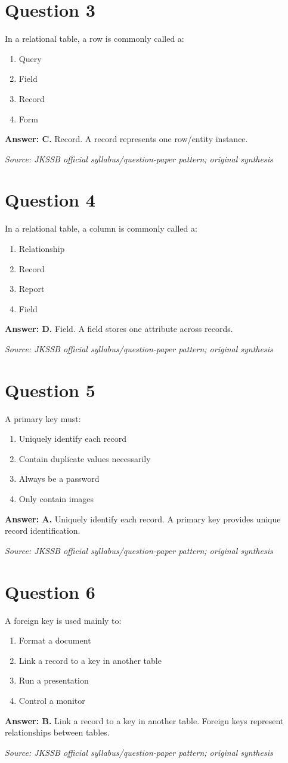 \documentclass[11pt,a4paper]{book}
\newcommand{\source}[1]{\par\smallskip\textit{Source: #1}}
\newcommand{\answer}[2]{\par\textbf{Answer: #1.} #2}
\begin{document}
\section*{Question 3}
In a relational table, a row is commonly called a:
\begin{enumerate}[label=\Alph*.]
\item Query
\item Field
\item Record
\item Form
\end{enumerate}
\answer{C}{Record. A record represents one row/entity instance.}
\source{JKSSB official syllabus/question-paper pattern; original synthesis}
\section*{Question 4}
In a relational table, a column is commonly called a:
\begin{enumerate}[label=\Alph*.]
\item Relationship
\item Record
\item Report
\item Field
\end{enumerate}
\answer{D}{Field. A field stores one attribute across records.}
\source{JKSSB official syllabus/question-paper pattern; original synthesis}
\section*{Question 5}
A primary key must:
\begin{enumerate}[label=\Alph*.]
\item Uniquely identify each record
\item Contain duplicate values necessarily
\item Always be a password
\item Only contain images
\end{enumerate}
\answer{A}{Uniquely identify each record. A primary key provides unique record identification.}
\source{JKSSB official syllabus/question-paper pattern; original synthesis}
\section*{Question 6}
A foreign key is used mainly to:
\begin{enumerate}[label=\Alph*.]
\item Format a document
\item Link a record to a key in another table
\item Run a presentation
\item Control a monitor
\end{enumerate}
\answer{B}{Link a record to a key in another table. Foreign keys represent relationships between tables.}
\source{JKSSB official syllabus/question-paper pattern; original synthesis}
\end{document}
